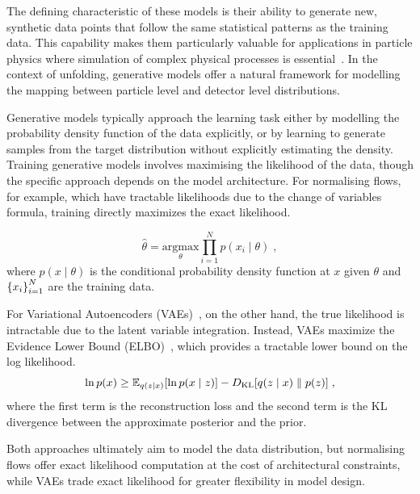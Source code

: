     The defining characteristic of these models is their ability to generate new, synthetic data points that follow the same statistical patterns as the training data.
    This capability makes them particularly valuable for applications in particle physics where simulation of complex physical processes is essential~\cite{Carleo2019MachineSciences, Albergo2019Flow-basedSHANAHAN}.
    In the context of unfolding, generative models offer a natural framework for modelling the mapping between particle level and detector level distributions.
    
    Generative models typically approach the learning task either by modelling the probability density function of the data explicitly, or by learning to generate samples from the target distribution without explicitly estimating the density.
    Training generative models involves maximising the likelihood of the data, though the specific approach depends on the model architecture.
    For normalising flows, for example, which have tractable likelihoods due to the change of variables formula, training directly maximizes the exact likelihood.
    
    \begin{equation}
        \hat{\theta} = \underset{\theta}{\text{argmax}} \prod_{i=1}^{N} p(x_i\mid\theta)\;,
    \end{equation}
    where \(p(x \mid \theta)\) is the conditional probability density function at \(x\) given \(\theta\) and \(\qty{x_i}_{i=1}^{N}\) are the training data.
    
    For Variational Autoencoders (VAEs)~\cite{Kingma2013Auto-EncodingBayes}, on the other hand, the true likelihood is intractable due to the latent variable integration.
    Instead, VAEs maximize the Evidence Lower Bound (ELBO)~\cite{Kingma2019AnAutoencoders}, which provides a tractable lower bound on the log likelihood.
    \begin{equation}
    \label{eq:ELBO}
        \ln p(x) \geq \mathbb{E}_{q(z\mid x)}\qty[\ln p(x\mid z)] - D_{\text{KL}}\qty[q(z\mid x) \;\|\; p(z)]\;,
    \end{equation}
    where the first term is the reconstruction loss and the second term is the KL divergence between the approximate posterior and the prior.
    
    Both approaches ultimately aim to model the data distribution, but normalising flows offer exact likelihood computation at the cost of architectural constraints, while VAEs trade exact likelihood for greater flexibility in model design.
    
